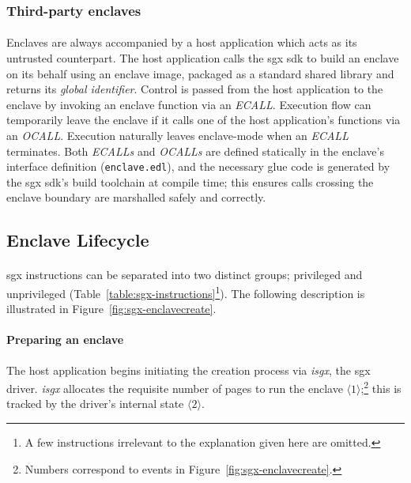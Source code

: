 \subsubsection{Third-party enclaves}
\paragraph{} Enclaves are always accompanied by a host application which acts as its untrusted counterpart. The host application calls the \acrshort{sgx} \acrshort{sdk} to build an enclave on its behalf using an enclave image, packaged as a standard shared library and returns its \textit{global identifier}. Control is passed from the host application to the enclave by invoking an enclave function via an \textit{ECALL}. Execution flow can temporarily leave the enclave if it calls one of the host application's functions via an \textit{OCALL}. Execution naturally leaves enclave-mode when an \textit{ECALL} terminates. Both \textit{ECALLs} and \textit{OCALLs} are defined statically in the enclave's interface definition (\texttt{enclave.edl}), and the necessary glue code is generated by the \acrshort{sgx} \acrshort{sdk}'s build toolchain at compile time; this ensures calls crossing the enclave boundary are marshalled safely and correctly.


\subsection{Enclave Lifecycle}
\label{sec:sgx-lifecycle}

\paragraph{} \acrshort{sgx}
instructions can be separated into two distinct groups; privileged and unprivileged (Table~\ref{table:sgx-instructions}\footnote{A few instructions irrelevant to the explanation given here are omitted.}). The following description is illustrated in Figure~\ref{fig:sgx-enclavecreate}.

\paragraph{Preparing an enclave} The host application begins initiating the creation process via \textit{isgx}, the \acrshort{sgx} driver. \textit{isgx} allocates the requisite number of pages to run the enclave $\langle 1 \rangle$;\footnote{Numbers correspond to events in Figure~\ref{fig:sgx-enclavecreate}.} this is tracked by the driver's internal state $\langle 2 \rangle$.

